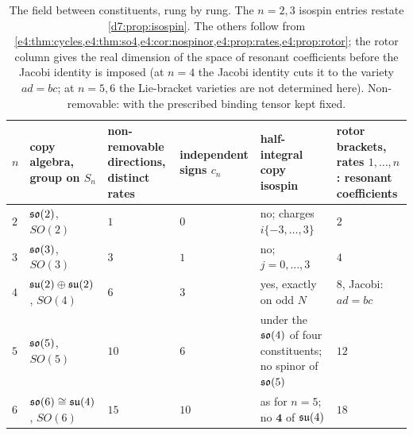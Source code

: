 \begin{table}[htbp]
\centering
\footnotesize
\begin{tabular}{@{}>{\raggedright\arraybackslash}p{0.4cm}>{\raggedright\arraybackslash}p{2.6cm}>{\raggedright\arraybackslash}p{2.0cm}>{\raggedright\arraybackslash}p{1.8cm}>{\raggedright\arraybackslash}p{3.8cm}>{\raggedright\arraybackslash}p{2.3cm}@{}}
\toprule
$n$ & copy algebra, group on $S_n$ & non-removable directions, distinct rates & independent signs $c_n$ & half-integral copy isospin & rotor brackets, rates $1,\dots,n$: resonant coefficients\\
\midrule
$2$ & $\mathfrak{so}(2)$, $SO(2)$ & $1$ & $0$ & no; charges $i\{-3,\dots,3\}$ & $2$\\
$3$ & $\mathfrak{so}(3)$, $SO(3)$ & $3$ & $1$ & no; $j=0,\dots,3$ & $4$\\
$4$ & $\mathfrak{su}(2)\oplus\mathfrak{su}(2)$, $SO(4)$ & $6$ & $3$ & yes, exactly on odd $N$ & $8$, Jacobi: $ad=bc$\\
$5$ & $\mathfrak{so}(5)$, $SO(5)$ & $10$ & $6$ & under the $\mathfrak{so}(4)$ of four constituents; no spinor of $\mathfrak{so}(5)$ & $12$\\
$6$ & $\mathfrak{so}(6)\cong\mathfrak{su}(4)$, $SO(6)$ & $15$ & $10$ & as for $n=5$; no $\mathbf 4$ of $\mathfrak{su}(4)$ & $18$\\
\bottomrule
\end{tabular}
\caption{The field between constituents, rung by rung. The $n=2,3$ isospin entries restate \cref{d7:prop:isospin}. The others follow from
\cref{e4:thm:cycles,e4:thm:so4,e4:cor:nospinor,e4:prop:rates,e4:prop:rotor}; the rotor column gives the real dimension of the space of resonant
coefficients before the Jacobi identity is imposed (at $n=4$ the Jacobi identity cuts it to the variety $ad=bc$; at $n=5,6$ the Lie-bracket varieties are
not determined here). Non-removable: with the prescribed binding tensor kept fixed.}
\label{e4:tab:ladder}
\end{table}

